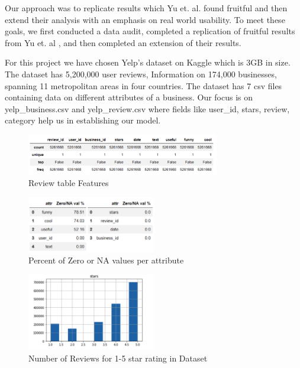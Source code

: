 \documentclass[12pt]{article}
\begin{document}
Our approach was to replicate results which Yu et. al. \cite{yu2015restaurants} found
fruitful and then extend their analysis with an emphasis on real world usability. To meet
these goals, we first conducted a data audit, completed a replication of fruitful results
from Yu et. al \cite{yu2015restaurants}, and then completed an extension of their results.

For this project we have chosen Yelp’s dataset on Kaggle \cite{YelpData59:online}
which is 3GB in size. The dataset has 5,200,000 user reviews, Information on 174,000 businesses,
spanning 11 metropolitan areas in four countries. The dataset has 7 csv files containing data on
different attributes of a business. Our focus is on yelp\_business.csv and yelp\_review.csv where
fields like user\_id, stars, review, category help us in establishing our model.

\begin{figure}[h]
  \caption{Review table Features}
  \centering
  \includegraphics[width=0.75\textwidth]{review_table}
  \end{figure}
  
  \begin{figure}[h]
  \caption{Percent of Zero or NA values per attribute}
  \centering
  \includegraphics[width=0.5\textwidth]{dataAudit}
  \end{figure}
  
  \begin{figure}[h]
  \caption{Number of Reviews for 1-5 star rating in Dataset}
  \centering
  \includegraphics[width=0.5\textwidth]{rating}
  \end{figure}
\end{document}

